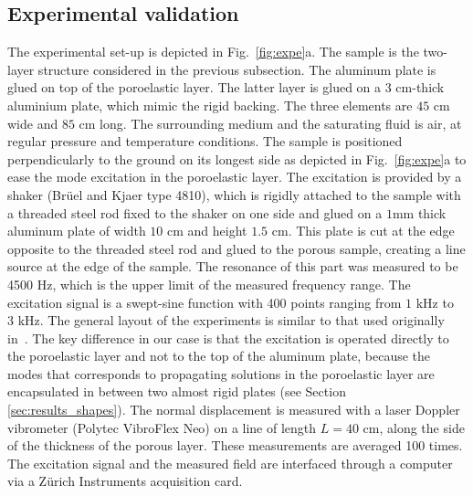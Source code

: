     \subsection{Experimental validation}
\label{sec:expe}
The experimental set-up is depicted in Fig.~\ref{fig:expe}a. The sample is the two-layer structure considered in the previous subsection. The aluminum plate is glued on top of the poroelastic layer. The latter layer is glued on a $3\textrm{ cm}$-thick aluminium plate, which mimic the rigid backing. The three elements are $45\textrm{ cm}$ wide and $85 \textrm{ cm}$ long. The surrounding medium and the saturating fluid is air, at regular pressure and temperature conditions. The sample is positioned perpendicularly to the ground on its longest side as depicted in Fig.~\ref{fig:expe}a to ease the mode excitation in the poroelastic layer. The excitation is provided by a shaker (Brüel and Kjaer type 4810), which is rigidly attached to the sample with a threaded steel rod fixed to the shaker on one side and glued on a $1 \textrm{mm}$ thick aluminum plate of width $10 \textrm{ cm}$ and height $1.5 \textrm{ cm}$. This plate is cut at the edge opposite to the threaded steel rod and glued to the porous sample, creating a line source at the edge of the sample. The resonance of this part was measured to be 4500 Hz, which is the upper limit of the measured frequency range. The excitation signal is a swept-sine function with 400 points ranging from $1 \textrm{ kHz}$ to $3 \textrm{ kHz}$. The general layout of the experiments is similar to that used originally in~\cite{geslain2016}. The key difference in our case is that the excitation is operated directly to the poroelastic layer and not to the top of the aluminum plate, because the modes that corresponds to propagating solutions in the poroelastic layer are encapsulated in between two almost rigid plates (see Section \ref{sec:results_shapes}). The normal displacement is measured with a laser Doppler vibrometer (Polytec VibroFlex Neo) on a line of length $L = 40$ cm, along the side of the thickness of the porous layer. These measurements are averaged 100 times. The excitation signal and the measured field are interfaced through a computer via a Zürich Instruments acquisition card. \\

